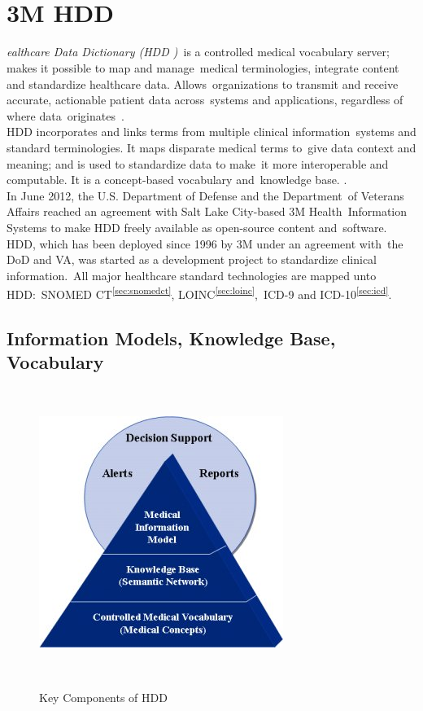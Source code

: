   \section[3M\textsuperscript{\texttrademark} Healthcare Data Dictionary (HDD)]
  {3M HDD\textsuperscript{\texttrademark}}
  \label{sec:hdd}
  
  \textit{ealthcare Data Dictionary (HDD )}\
  is a controlled medical vocabulary server; makes it possible to map and manage\
  medical terminologies, integrate content and standardize healthcare data. Allows\
  organizations to transmit and receive accurate, actionable patient data across\
  systems and applications, regardless of where data\
  originates~\citep{_3M_Healthcare_Data_Dictionary_2013}.\\
  
  \noindent HDD incorporates and links terms from multiple clinical information\
  systems and standard terminologies. It maps disparate medical terms to\
  give data context and meaning; and is used to standardize data to make\
  it more interoperable and computable. It is a concept-based vocabulary and\
  knowledge base. \citep{_3M_Healthcare_Data_Dictionary_2013}.\\

  \noindent In June 2012, the U.S. Department of Defense and the Department\
  of Veterans Affairs reached an agreement with Salt Lake City-based 3M Health\
  Information Systems to make HDD freely available as open-source content and\
  software. HDD, which has been deployed since 1996 by 3M under an agreement with\
  the DoD and VA, was started as a development project to standardize clinical information.\
  All major healthcare standard technologies are mapped unto HDD:\
  SNOMED CT\textsuperscript{\ref{sec:snomedct}}, LOINC\textsuperscript{\ref{sec:loinc}},\
  ICD-9 and ICD-10\textsuperscript{\ref{sec:icd}}.\citep{_DeGaspari_2013}\
 
  \subsection{Information Models, Knowledge Base, Vocabulary}\

  \begin{figure}[ht!]
    \label{fig:ikv}
    \centering
    \includegraphics[scale=0.75]{hdd.jpg}
    \caption{Key Components of HDD}\citep{_3M_HDD_Product_Overview_2010}\
  \end{figure}  

